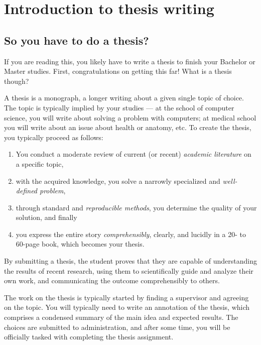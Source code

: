 \chapter{Introduction to thesis writing}
\label{chap:refs}

\section{So you have to do a thesis?}


If you are reading this, you likely have to write a thesis to finish your Bachelor or Master studies. First, congratulations on getting this far! What is a thesis though?

A thesis is a monograph, a longer writing about a given single topic of choice. The topic is typically implied by your studies --- at the school of computer science, you will write about solving a problem with computers; at medical school you will write about an issue about health or anatomy, etc. To create the thesis, you typically proceed as follows:
\begin{enumerate}
\item You conduct a moderate review of current (or recent) \emph{academic literature} on a specific topic,
\item with the acquired knowledge, you solve a narrowly specialized and \emph{well-defined problem},
\item through standard and \emph{reproducible methods}, you determine the quality of your solution, and finally\item you express the entire story \emph{comprehensibly}, clearly, and lucidly in a 20- to 60-page book, which becomes your thesis.
\end{enumerate}

By submitting a thesis, the student proves that they are capable of understanding the results of recent research, using them to scientifically guide and analyze their own work, and communicating the outcome comprehensibly to others.

The work on the thesis is typically started by finding a supervisor and agreeing on the topic. You will typically need to write an annotation of the thesis, which comprises a condensed summary of the main idea and expected results. The choices are submitted to administration, and after some time, you will be officially tasked with completing the thesis assignment.

